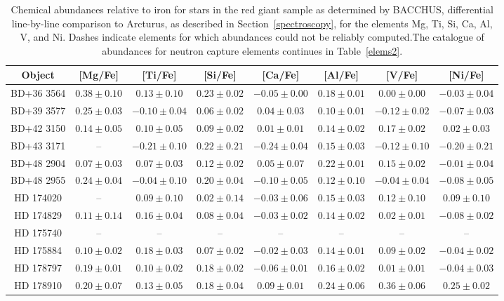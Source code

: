 \begin{table*}
\caption{Chemical abundances relative to iron for stars in the red giant sample as determined by BACCHUS,  differential line-by-line comparison to Arcturus, as described in Section~\ref{spectroscopy}, for the elements Mg, Ti, Si, Ca, Al, V, and Ni. Dashes indicate elements for which abundances could not be reliably computed.The catalogue of abundances for neutron capture elements continues in Table~\ref{elems2}.\label{elems1}}
\begin{tabular}{cccccccc}
\hline \hline
Object & [Mg/Fe] & [Ti/Fe] & [Si/Fe] & [Ca/Fe] & [Al/Fe] & [V/Fe] & [Ni/Fe] \\
\hline
BD+36 3564 & $0.38 \pm 0.10$ & $0.13 \pm 0.10$ & $0.23 \pm 0.02$ & $-0.05 \pm 0.00$ & $0.18 \pm 0.01$ & $0.00 \pm 0.00$ & $-0.03 \pm 0.04$ \\
BD+39 3577 & $0.25 \pm 0.03$ & $-0.10 \pm 0.04$ & $0.06 \pm 0.02$ & $0.04 \pm 0.03$ & $0.10 \pm 0.01$ & $-0.12 \pm 0.02$ & $-0.07 \pm 0.03$ \\
BD+42 3150 & $0.14 \pm 0.05$ & $0.10 \pm 0.05$ & $0.09 \pm 0.02$ & $0.01 \pm 0.01$ & $0.14 \pm 0.02$ & $0.17 \pm 0.02$ & $0.02 \pm 0.03$ \\
BD+43 3171 & -- & $-0.21 \pm 0.10$ & $0.22 \pm 0.21$ & $-0.24 \pm 0.04$ & $0.15 \pm 0.03$ & $-0.12 \pm 0.10$ & $-0.20 \pm 0.21$ \\
BD+48 2904 & $0.07 \pm 0.03$ & $0.07 \pm 0.03$ & $0.12 \pm 0.02$ & $0.05 \pm 0.07$ & $0.22 \pm 0.01$ & $0.15 \pm 0.02$ & $-0.01 \pm 0.04$ \\
BD+48 2955 & $0.24 \pm 0.04$ & $-0.04 \pm 0.10$ & $0.20 \pm 0.04$ & $-0.10 \pm 0.05$ & $0.12 \pm 0.10$ & $-0.04 \pm 0.04$ & $-0.08 \pm 0.05$ \\
HD 174020 & -- & $0.09 \pm 0.10$ & $0.02 \pm 0.14$ & $-0.03 \pm 0.06$ & $0.15 \pm 0.03$ & $0.12 \pm 0.10$ & $0.09 \pm 0.10$ \\
HD 174829 & $0.11 \pm 0.14$ & $0.16 \pm 0.04$ & $0.08 \pm 0.04$ & $-0.03 \pm 0.02$ & $0.14 \pm 0.02$ & $0.02 \pm 0.01$ & $-0.08 \pm 0.02$ \\
HD 175740 & -- & -- & -- & -- & -- & -- & -- \\
HD 175884 & $0.10 \pm 0.02$ & $0.18 \pm 0.03$ & $0.07 \pm 0.02$ & $-0.02 \pm 0.03$ & $0.14 \pm 0.01$ & $0.09 \pm 0.02$ & $-0.04 \pm 0.02$ \\
HD 178797 & $0.19 \pm 0.01$ & $0.10 \pm 0.02$ & $0.18 \pm 0.02$ & $-0.06 \pm 0.01$ & $0.16 \pm 0.02$ & $0.01 \pm 0.01$ & $-0.04 \pm 0.03$ \\
HD 178910 & $0.20 \pm 0.07$ & $0.13 \pm 0.05$ & $0.18 \pm 0.04$ & $0.09 \pm 0.01$ & $0.24 \pm 0.06$ & $0.36 \pm 0.06$ & $0.25 \pm 0.02$ \\

\end{tabular}
\end{table*}
